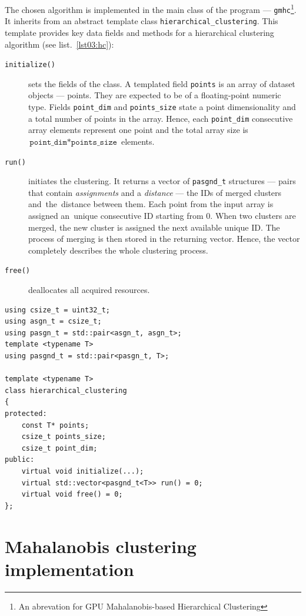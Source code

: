 The chosen algorithm is implemented in the main class of the program --- \texttt{gmhc}\footnote{An abrevation for GPU Mahalanobis-based Hierarchical Clustering}. It inherits from an abstract template class \texttt{hierarchical\_clustering}.
This template provides key data fields and methods for a hierarchical clustering algorithm (see list.~\ref{lst03:hc}): 

\begin{description}
	\item[\texttt{initialize()}] sets the fields of the class. A templated field \texttt{points} is an array of dataset objects --- points. They are expected to be of a floating-point numeric type. Fields \texttt{point\_dim} and \texttt{points\_size} state a point dimensionality and a total number of points in the array. Hence, each \texttt{point\_dim} consecutive array elements represent one point and the total array size is~$\texttt{point\_dim}*\texttt{points\_size}$ elements.
	
	\item[\texttt{run()}] initiates the clustering. It returns a vector of \texttt{pasgnd\_t} structures --- pairs that contain \emph{assignments} and a \emph{distance} --- the IDs of merged clusters and~the~distance between them. Each point from the input array is assigned an~unique consecutive ID starting from $0$. When two clusters are merged, the new cluster is assigned the next available unique ID. The process of merging is then stored in the returning vector. Hence, the vector completely describes the whole clustering process.
	
	\item[\texttt{free()}] deallocates all acquired resources.
\end{description}

\begin{lstlisting}[caption={A summary of \texttt{hierarchical\_clustering} header file.},label={lst03:hc}]
using csize_t = uint32_t;
using asgn_t = csize_t;
using pasgn_t = std::pair<asgn_t, asgn_t>;
template <typename T>
using pasgnd_t = std::pair<pasgn_t, T>;

template <typename T>
class hierarchical_clustering
{
protected:
	const T* points;
	csize_t points_size;
	csize_t point_dim;
public:
	virtual void initialize(...);
	virtual std::vector<pasgnd_t<T>> run() = 0;
	virtual void free() = 0;
};
\end{lstlisting}

\section{Mahalanobis clustering implementation}

